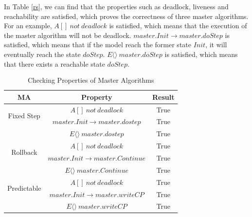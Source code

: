 In Table \ref{rs}, we can find that the properties such as deadlock, liveness and reachability are satisfied,  which proves the correctness of three master algorithms. For an example, $A[]~not~deadlock$ is satisfied, which means that the execution of the master algorithm will not be deadlock. $master.Init \rightarrow master.doStep$ is satisfied, which means that if the model reach the former state $Init$, it will eventually reach the state $doStep$. $E\langle\rangle~master.doStep$ is satisfied, which means that there exists a reachable state $doStep$. 

\begin{table}
\caption{Checking Properties of Master Algorithms}
\centering
\begin{tabular}{c c c}
        \hline
        MA & Property & Result\\
        \hline
        \multirow{2}{2.0cm}{Fixed Step}
                & $A[]~not~deadlock$ & True\\
                & $master.Init \rightarrow master.dostep$ & True\\
                & $E\langle\rangle~master.dostep$ & True\\

        \hline
        \multirow{2}{2.0cm}{Rollback}
                & $A[]~not~deadlock$ & True\\
                & $master.Init \rightarrow master.Continue$ & True\\
                & $E\langle\rangle~master.Continue$ & True\\

        \hline
        \multirow{2}{2.0cm}{Predictable}
                & $A[]~not~deadlock$ & True\\
                & $master.Init \rightarrow  master.writeCP$ & True\\
                & $E\langle\rangle~master.writeCP$ & True\\
        \hline
\end{tabular}
\label{ta_rs}
\end{table}


